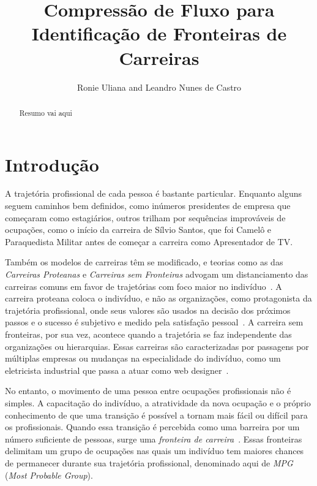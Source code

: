 \documentclass[
  article,
  11pt,
  a4paper,
  english,
  brazil,
  sumario=tradicional]{abntex2}
\title{Compressão de Fluxo para Identificação de Fronteiras de Carreiras}
\author{Ronie Uliana and Leandro Nunes de Castro}
\begin{document}

\frenchspacing

\maketitle

\begin{abstract}
Resumo vai aqui
\end{abstract}

\section{Introdução}

A trajetória profissional de cada pessoa é bastante particular. Enquanto alguns seguem caminhos bem definidos, como inúmeros presidentes de empresa que começaram como estagiários, outros trilham por sequências improváveis de ocupações, como o início da carreira de Sílvio Santos, que foi Camelô e Paraquedista Militar antes de começar a carreira como Apresentador de TV.

Também os modelos de carreiras têm se modificado, e teorias como as das \textit{Carreiras Proteanas} e \textit{Carreiras sem Fronteiras} advogam um distanciamento das carreiras comuns em favor de trajetórias com foco maior no indivíduo~\cite{Bendassolli2009-bg}. A carreira proteana coloca o indivíduo, e não as organizações, como protagonista da trajetória profissional, onde seus valores são usados na decisão dos próximos passos e o sucesso é subjetivo e medido pela satisfação pessoal~\cite{Hall2004-ke}. A carreira sem fronteiras, por sua vez, acontece quando a trajetória se faz independente das organizações ou hierarquias. Essas carreiras são caracterizadas por passagens por múltiplas empresas ou mudanças na especialidade do indivíduo, como um eletricista industrial que passa a atuar como web designer~\cite{Arthur1994-qq}.


No entanto, o movimento de uma pessoa entre ocupações profissionais não é simples. A capacitação do indivíduo, a atratividade da nova ocupação e o próprio conhecimento de que uma transição é possível a tornam mais fácil ou difícil para os profissionais. Quando essa transição é percebida como uma barreira por um número suficiente de pessoas, surge uma \textit{fronteira de carreira}~\cite{Gunz2007-hr}. Essas fronteiras delimitam um grupo de ocupações nas quais um indivíduo tem maiores chances de permanecer durante sua trajetória profissional, denominado aqui de \textit{MPG} (\textit{Most Probable Group}).
\end{document}
